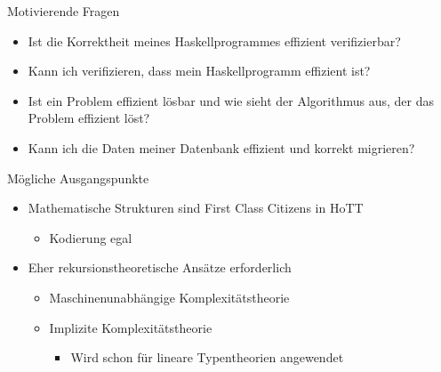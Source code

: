 \documentclass[11pt,aspectratio=169,notheorems]{beamer}
\begin{document}
\begin{frame}{Motivierende Fragen}
    \begin{itemize}
        \item Ist die Korrektheit meines Haskellprogrammes effizient verifizierbar?
        \item Kann ich verifizieren, dass mein Haskellprogramm effizient ist?
        \item Ist ein Problem effizient lösbar und wie sieht der Algorithmus aus, der das Problem effizient löst?
        \item Kann ich die Daten meiner Datenbank effizient und korrekt migrieren?
    \end{itemize}
\end{frame}

\begin{frame}{Mögliche Ausgangspunkte}
    \begin{itemize}
        \item Mathematische Strukturen sind \glqq{}First Class Citizens\grqq{} in HoTT
        \begin{itemize}
            \item Kodierung egal
        \end{itemize}
        \item Eher rekursionstheoretische Ansätze erforderlich~\cite{ctinctt}
        \begin{itemize}
            \item Maschinenunabhängige Komplexitätstheorie
            \item Implizite Komplexitätstheorie~\cite{icc}
            \begin{itemize}
                \item Wird schon für lineare Typentheorien angewendet
            \end{itemize}
        \end{itemize}
    \end{itemize}
\end{frame}
\end{document}
